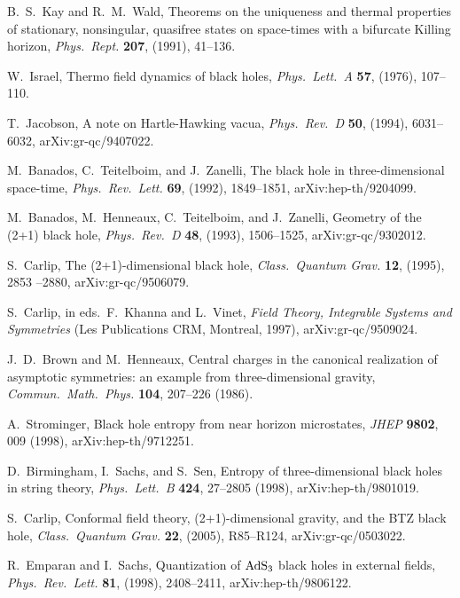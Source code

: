 \documentclass[11pt]{article}
\begin{document}
\begin{thebibliography}{999}
 B.\ S.\ Kay and R.\ M.\ Wald, Theorems on the 
uniqueness and thermal properties of stationary, nonsingular, 
quasifree states on space-times with a bifurcate Killing horizon,
\emph{Phys.\ Rept.} {\bf 207}, (1991), 41--136.

 W.\ Israel, Thermo field dynamics of black holes,
\emph{Phys.\ Lett.\ A} {\bf 57}, (1976), 107--110.

 T.\ Jacobson, A note on Hartle-Hawking vacua,
\emph{Phys.\ Rev.\ D} {\bf 50}, (1994), 6031--6032, 
arXiv:gr-qc/9407022.

 M.\ Banados, C.\ Teitelboim, and J.\ Zanelli, 
The black hole in three-dimensional space-time, \emph{Phys.\ 
Rev.\ Lett.} {\bf 69}, (1992), 1849--1851, arXiv:hep-th/9204099.

 M.\ Banados, M.\ Henneaux, C.\ Teitelboim, 
and J.\ Zanelli, Geometry of the (2+1) black hole, \emph{Phys.\
Rev.\ D} {\bf 48}, (1993), 1506--1525, arXiv:gr-qc/9302012.

  S.\ Carlip, The (2+1)-dimensional black hole,
\emph{Class.\ Quantum Grav.} {\bf 12}, (1995), 2853 --2880,
 arXiv:gr-qc/9506079.

 S.\ Carlip, in eds.\ F.\ Khanna and L.\ Vinet,
\emph{Field Theory, Integrable Systems and Symmetries}
(Les Publications CRM, Montreal, 1997), arXiv:gr-qc/9509024.

 J.~D.\ Brown and M.\ Henneaux, Central charges 
in the canonical realization of asymptotic symmetries: an example 
from three-dimensional gravity, \emph{Commun.\ Math.\ 
 Phys.} {\bf 104}, 207--226 (1986).

\bibitem{Strominger} A.\ Strominger, Black hole entropy from near 
horizon microstates, \emph{JHEP} {\bf 9802}, 009 (1998),  
arXiv:hep-th/9712251.

\bibitem{BSS} D.\ Birmingham, I.\ Sachs, and S.\ Sen, Entropy of 
three-dimensional black holes in string theory, \emph{Phys.\ Lett.\ B}
 {\bf 424}, 27--2805 (1998), arXiv:hep-th/9801019.

\bibitem{CarlipBTZb} S.\ Carlip, Conformal field theory, 
(2+1)-dimensional gravity, and the BTZ black hole, \emph{Class.\
Quantum Grav.} {\bf 22}, (2005), R85--R124, arXiv:gr-qc/0503022.

\bibitem{ES} R.\ Emparan and I.\ Sachs, Quantization of $\hbox{AdS}_3$ 
black holes in external fields, \emph{Phys.\ Rev.\ Lett.} {\bf 81}, (1998), 
2408--2411, arXiv:hep-th/9806122.


\end{thebibliography}
\end{document}
